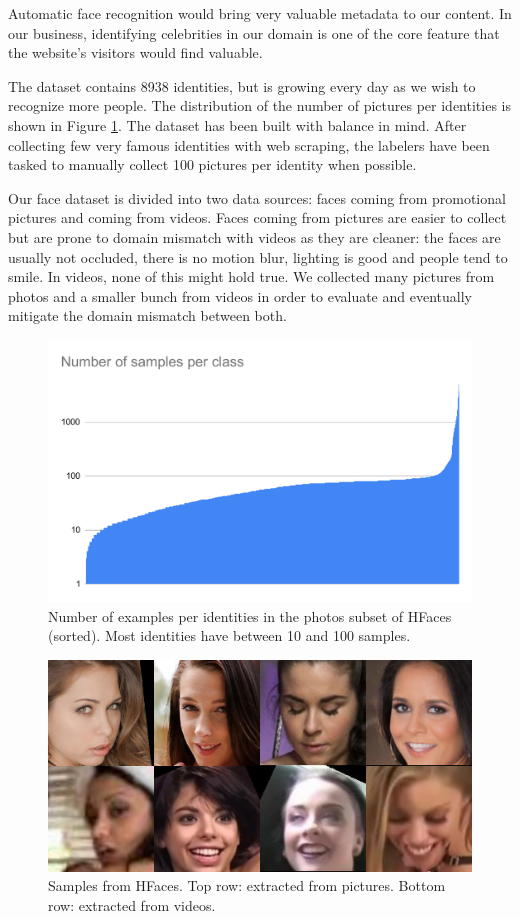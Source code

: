 Automatic face recognition would bring very valuable metadata to our content. In our business, identifying celebrities in our domain is one of the core feature that the website's visitors would find valuable.

The dataset contains 8938 identities, but is growing every day as we wish to recognize more people. The distribution of the number of pictures per identities is shown in Figure \ref{fig:xfaces-num}. The dataset has been built with balance in mind. After collecting few very famous identities with web scraping, the labelers have been tasked to manually collect 100 pictures per identity when possible.

Our face dataset is divided into two data sources: faces coming from promotional pictures and coming from videos. Faces coming from pictures are easier to collect but are prone to domain mismatch with videos as they are cleaner: the faces are usually not occluded, there is no motion blur, lighting is good and people tend to smile. In videos, none of this might hold true. We collected many pictures from photos and a smaller bunch from videos in order to evaluate and eventually mitigate the domain mismatch between both.

\begin{figure}
    \centering
    \includegraphics[width=0.7\columnwidth]{20-files/xfaces-num.pdf}
    \caption{Number of examples per identities in the photos subset of HFaces (sorted). Most identities have between 10 and 100 samples.}
    \label{fig:xfaces-num}
\end{figure}

\begin{figure}
    \centering
    \includegraphics[scale=1.5]{20-files/xfaces-samples.jpg}
    \caption{Samples from HFaces. Top row: extracted from pictures. Bottom row: extracted from videos.}
    \label{fig:xfaces-samples}
\end{figure}

